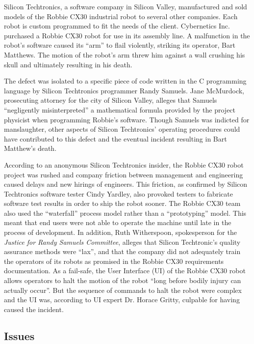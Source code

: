 Silicon Techtronics, a software company in Silicon Valley, manufactured and
sold models of the Robbie CX30 industrial robot to several other companies. Each
robot is custom programmed to fit the needs of the client. Cybernetics Inc.
purchased a Robbie CX30 robot for use in its assembly line. A malfunction in the
robot's software caused its ``arm'' to flail violently, striking its operator,
Bart Matthews. The motion of the robot's arm threw him against a wall crushing
his skull and ultimately resulting in his death.

The defect was isolated to a specific piece of code written in the C programming
language by Silicon Techtronics programmer Randy Samuels. Jane McMurdock,
prosecuting attorney for the city of Silicon Valley, alleges that Samuels
``negligently misinterpreted'' a mathematical formula provided by the project
physicist when programming Robbie's software. Though Samuels was indicted for
manslaughter, other aspects of Silicon Techtronics' operating procedures could
have contributed to this defect and the eventual incident resulting in Bart
Matthew's death.

According to an anonymous Silicon Techtronics insider, the Robbie CX30 robot
project was rushed and company friction between management and engineering 
caused delays and new hirings of engineers. This friction, as confirmed by
Silicon Techtronics software tester Cindy Yardley, also provoked testers to
fabricate software test results in order to ship the robot sooner. The Robbie
CX30 team also used the ``waterfall'' \cite{Royce70} process model rather than
a ``prototyping'' model. This meant that end users were not able to operate the
machine until late in the process of development. In addition, Ruth
Witherspoon, spokesperson for the \textit{Justice for Randy Samuels Committee},
alleges that Silicon Techtronic's quality assurance methods were ``lax'', and
that the company did not adequately train the operators of its robots as
promised in the Robbie CX30 requirements documentation. As a fail-safe, the User
Interface (UI) of the Robbie CX30 robot allows operators to halt the motion of
the robot ``long before bodily injury can actually occur''. But the sequence of
commands to halt the robot were complex and the UI was, according to UI expert
Dr. Horace Gritty, culpable for having caused the incident.

\subsection{Issues}
